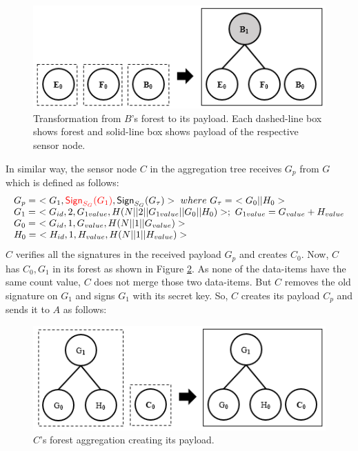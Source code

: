 		\begin{figure}[h!]
			\centering
			\includegraphics{images/b-forest-payload.png}
			\caption{Transformation from $B$'s forest to its payload.
			 				Each dashed-line box shows forest and solid-line box shows payload of the respective sensor node.}
			\label{fig:b-forest-payload}
		\end{figure}

		In similar way, the sensor node $C$ in the aggregation tree receives $G_{p}$ from $G$ which is defined as follows:
		\begin{equation}
			\begin{array}{l}
				G_{p} =\ <G_{1},\textcolor{red}{\textsf{Sign}_{S_{G}}(G_{1})}, \textsf{Sign}_{S_{G}}(G_{\tau})>\ where\ G_{\tau} =\ <G_{0} || H_{0}>\\
				G_{1} =\ < G_{id}, 2, G_{1value}, H(N||2||G_{1value}||G_{0}||H_{0})>;\ G_{1value} = G_{value} + H_{value} \\
				G_{0} =\ <G_{id}, 1, G_{value}, H(N||1||G_{value})>\\
				H_{0} =\ <H_{id}, 1, H_{value}, H(N||1||H_{value})>
			\end{array}
		\end{equation}
		$C$ verifies all the signatures in the received payload $G_{p}$ and creates $C_{0}$.
		Now, $C$ has $C_{0},G_{1}$ in its forest as shown in Figure \ref{fig:c-forest-payload}. 
		As none of the data-items have the same count value, $C$ does not merge those two data-items.
		But $C$ removes the old signature on $G_{1}$ and signs $G_{1}$ with its secret key.
		So, $C$ creates its payload $C_{p}$ and sends it to $A$ as follows:
		\begin{figure}[h!]
			\centering
			\includegraphics{images/c-forest-payload.png}
			\caption{$C$'s forest aggregation creating its payload.}
			\label{fig:c-forest-payload}
		\end{figure}
